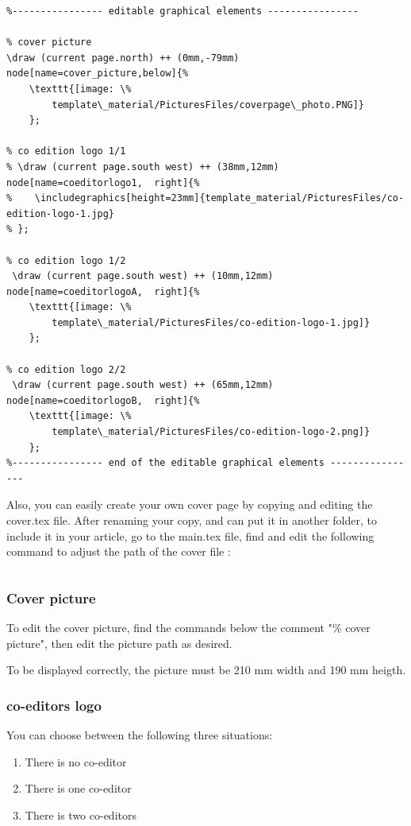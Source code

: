 \documentclass[Theme1]{{template_material/eurostat}}
\begin{document}
\begin{verbatim}
%---------------- editable graphical elements ----------------
    
% cover picture
\draw (current page.north) ++ (0mm,-79mm) node[name=cover_picture,below]{%
    \texttt{[image: \%
        template\_material/PicturesFiles/coverpage\_photo.PNG]}
    };

% co edition logo 1/1
% \draw (current page.south west) ++ (38mm,12mm) node[name=coeditorlogo1,  right]{%
%    \includegraphics[height=23mm]{template_material/PicturesFiles/co-edition-logo-1.jpg}
% }; 
     
% co edition logo 1/2
 \draw (current page.south west) ++ (10mm,12mm) node[name=coeditorlogoA,  right]{%
    \texttt{[image: \%
        template\_material/PicturesFiles/co-edition-logo-1.jpg]}
    }; 
     
% co edition logo 2/2
 \draw (current page.south west) ++ (65mm,12mm) node[name=coeditorlogoB,  right]{%
    \texttt{[image: \%
        template\_material/PicturesFiles/co-edition-logo-2.png]}
    }; 
%---------------- end of the editable graphical elements ----------------
\end{verbatim}

Also, you can easily create your own cover page by copying and editing the cover.tex file. After renaming your copy, and can put it in another folder, to include it in your article, go to the main.tex file, find and edit the following command to adjust the path of the cover file :
\begin{verbatim}

\end{verbatim}

\subsubsection{Cover picture}

To edit the cover picture, find the  commands below the comment "\% cover picture", then edit the picture path as desired.

To be displayed correctly, the picture must be 210 mm width and 190 mm heigth. 

\subsubsection{co-editors logo}

You can choose between the following three situations:
\begin{enumerate}
    \item There is no co-editor
    \item There is one co-editor
    \item There is two co-editors
\end{enumerate}
\end{document}
